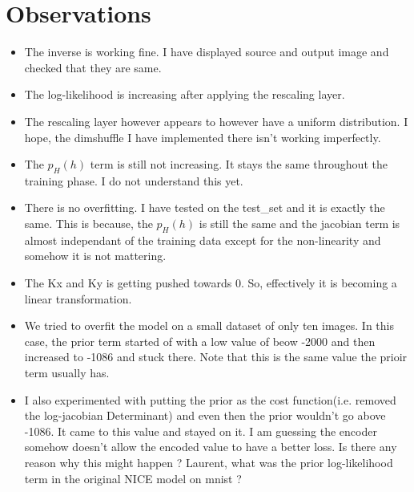 \documentclass{article}
\begin{document}
\section{Observations}
\begin{itemize}
\item The inverse is working fine. I have displayed source and output image and checked that they are same.
\item The log-likelihood is increasing after applying the rescaling layer.
\item The rescaling layer however appears to however have a uniform distribution. I hope, the dimshuffle I have implemented there isn't working imperfectly.
\item The $p_H(h)$ term is still not increasing. It stays the same throughout the training phase. I do not understand this yet.
\item There is no overfitting. I have tested on the test\_set and it is exactly the same. This is because, the $p_H(h)$ is still the same and the jacobian term is almost independant of the training data except for the non-linearity and somehow it is not mattering.
\item The Kx and Ky is getting pushed towards 0. So, effectively it is becoming a linear transformation.
\item We tried to overfit the model on a small dataset of only ten images. In this case, the prior term started of with a low value of beow -2000 and then increased to -1086 and stuck there. Note that this is the same value the prioir term usually has.
\item I also experimented with putting the prior as the cost function(i.e. removed the log-jacobian Determinant) and even then the prior wouldn't go above -1086. It came to this value and stayed on it. I am guessing the encoder somehow doesn't allow the encoded value to have a better loss. Is there any reason why this might happen ? Laurent, what was the prior log-likelihood term in the original NICE model on mnist ?
\end{itemize}
\end{document}
